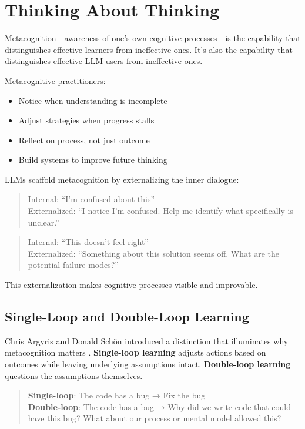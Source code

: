 \chapter{Thinking About Thinking}

Metacognition---awareness of one's own cognitive processes---is the capability that distinguishes effective learners from ineffective ones. It's also the capability that distinguishes effective LLM users from ineffective ones.

Metacognitive practitioners:

\begin{itemize}
    \item Notice when understanding is incomplete
    \item Adjust strategies when progress stalls
    \item Reflect on process, not just outcome
    \item Build systems to improve future thinking
\end{itemize}

LLMs scaffold metacognition by externalizing the inner dialogue:

\begin{quote}
Internal: ``I'm confused about this'' \\
Externalized: ``I notice I'm confused. Help me identify what specifically is unclear.''
\end{quote}

\begin{quote}
Internal: ``This doesn't feel right'' \\
Externalized: ``Something about this solution seems off. What are the potential failure modes?''
\end{quote}

This externalization makes cognitive processes visible and improvable.

\section{Single-Loop and Double-Loop Learning}

Chris Argyris and Donald Sch{\"o}n introduced a distinction that illuminates why metacognition matters \cite{argyris1977double, argyris1978organizational}. \textbf{Single-loop learning} adjusts actions based on outcomes while leaving underlying assumptions intact. \textbf{Double-loop learning} questions the assumptions themselves.

\begin{quote}
\textbf{Single-loop}: The code has a bug → Fix the bug \\
\textbf{Double-loop}: The code has a bug → Why did we write code that could have this bug? What about our process or mental model allowed this?
\end{quote}

